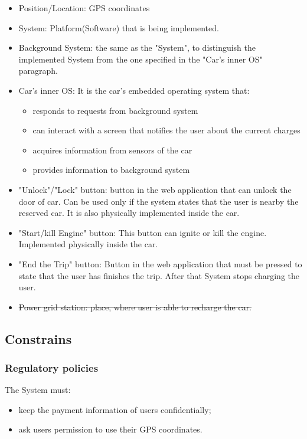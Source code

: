 \documentclass[12pt, letterpaper]{article}
\begin{document}
\begin{itemize}
	\item Position/Location: GPS coordinates
	\item System: Platform(Software) that is being implemented.
	\item Background System: the same as the "System", to distinguish the implemented System from the one specified in the "Car’s inner OS" paragraph.
	\item Car’s inner OS: It is the car’s embedded operating system that:
	\begin{itemize}
		\item responds to requests from background system
		\item can interact with a screen that notifies the user about the current charges
		\item acquires information from sensors of the car
		\item provides information to background system
	\end{itemize}
	\item "Unlock"/"Lock" button: button in the web application that can unlock the door of car. Can be used only if the system states that the user is nearby the reserved car. It is also physically implemented inside the car. 
	\item "Start/kill Engine" button: This button can ignite or kill the engine. Implemented
	physically inside the car.
	\item "End the Trip" button: Button in the web application that must be pressed to state that the user has finishes the trip. After that System stops charging the user.
	\item \sout{Power grid station: place, where user is able to recharge the car.}
\end{itemize}




\subsection{Constrains}
\subsubsection{Regulatory policies}
The System must:
\begin{itemize}
	\item keep the payment information of users confidentially;
	\item ask users permission to use their GPS coordinates.
\end{itemize}
\end{document}
